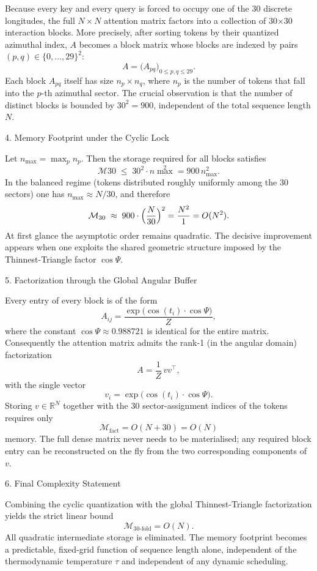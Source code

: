 Because every key and every query is forced to occupy one of the 30 discrete longitudes, the full \(N\times N\) attention matrix factors into a collection of 30×30 interaction blocks.  More precisely, after sorting tokens by their quantized azimuthal index, \(A\) becomes a block matrix whose blocks are indexed by pairs \((p,q)\in\{0,\dots,29\}^2\):
\[
A=\bigl(A_{pq}\bigr)_{0\le p,q\le 29}.
\]
Each block \(A_{pq}\) itself has size \(n_p\times n_q\), where \(n_p\) is the number of tokens that fall into the \(p\)-th azimuthal sector.  The crucial observation is that the number of distinct blocks is bounded by \(30^2=900\), independent of the total sequence length \(N\).

4. Memory Footprint under the Cyclic Lock

Let \(n_{\max}=\max_p n_p\).  Then the storage required for all blocks satisfies
\[
\mathcal{M}{30}\;\le\;30^2\cdot n{\max}^2=900\,n_{\max}^2.
\]
In the balanced regime (tokens distributed roughly uniformly among the 30 sectors) one has \(n_{\max}\approx N/30\), and therefore
\[
\mathcal{M}_{30}\;\approx\;900\cdot\Bigl(\frac{N}{30}\Bigr)^2=\frac{N^2}{1}=O(N^2).
\]
At first glance the asymptotic order remains quadratic.  The decisive improvement appears when one exploits the shared geometric structure imposed by the Thinnest-Triangle factor \(\cos\Psi\).

5. Factorization through the Global Angular Buffer

Every entry of every block is of the form
\[
A_{ij}=\frac{\exp\bigl(\cos(t_i)\cdot\cos\Psi\bigr)}{Z},
\]
where the constant \(\cos\Psi\approx0.988721\) is identical for the entire matrix.  Consequently the attention matrix admits the rank-1 (in the angular domain) factorization
\[
A=\frac{1}{Z}\,vv^\top,
\]
with the single vector
\[
v_i=\exp\bigl(\cos(t_i)\cdot\cos\Psi\bigr).
\]
Storing \(v\in\mathbb{R}^N\) together with the 30 sector-assignment indices of the tokens requires only
\[
\mathcal{M}_{\text{fact}}=O(N+30)=O(N)
\]
memory.  The full dense matrix never needs to be materialised; any required block entry can be reconstructed on the fly from the two corresponding components of \(v\).

6. Final Complexity Statement

Combining the cyclic quantization with the global Thinnest-Triangle factorization yields the strict linear bound
\[
\boxed{\mathcal{M}_{30\text{-fold}}=O(N)}.
\]
All quadratic intermediate storage is eliminated.  The memory footprint becomes a predictable, fixed-grid function of sequence length alone, independent of the thermodynamic temperature \(\tau\) and independent of any dynamic scheduling.

